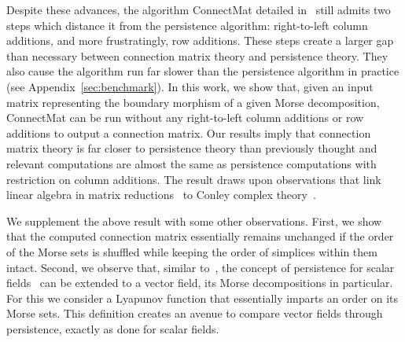 \documentclass[a4paper,english,cleveref]{article}
\theoremstyle{plain}
\newcounter{li}
\newcommand{\tamal}[1]{\textcolor{blue}{#1}}
\begin{document}
Despite these advances, the algorithm {\sc ConnectMat} detailed in~\cite{DLMS24} still admits two steps which distance it from the persistence algorithm: right-to-left column additions, and more frustratingly, row additions. These steps create a larger gap than necessary between connection matrix theory and persistence theory. They also cause the algorithm run far slower than the persistence algorithm in practice (see Appendix~\ref{sec:benchmark}). In this work, we show that, given an input matrix
representing the boundary morphism of a given Morse decomposition,
{\sc ConnectMat} can be run without any right-to-left column additions or row additions to output a connection matrix. Our results imply that connection matrix theory is far closer to persistence theory than previously thought and relevant computations are almost the same as persistence computations with restriction on column additions. The result draws upon observations that link linear algebra in matrix reductions~\cite{DW22,EH2010} to Conley complex theory~\cite{MW2021b}. 

We supplement the above result with some other observations. First, we show that
the computed connection matrix essentially remains unchanged if the order of the Morse sets is shuffled while keeping the order of simplices within them intact. %
Second, we observe that, similar to~\cite{BL24}, the concept of persistence for scalar fields~\cite{EH2010} can be
extended to a vector field, its Morse decompositions in particular.
For this we consider a Lyapunov function that essentially imparts an order on its Morse sets. This definition creates an avenue to compare vector fields through persistence, exactly as done for scalar fields.

\end{document}
